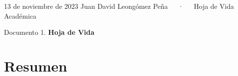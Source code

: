 \documentclass[11pt,a4paper,]{awesome-cv}
\begin{document}
\makecvheader

\makecvfooter
  {13 de noviembre de 2023}
    {Juan David Leongómez Peña~~~·~~~Hoja de Vida Académica}
  {\thepage}





\vspace{4mm}
\begin{tcolorbox}[enhanced,
        on line, 
        boxsep=4pt, left=0pt,right=0pt,top=0pt,bottom=0pt,
        colframe=white,colback=black]
  
\color{white}
\begin{LARGE}\begin{center}
Documento 1. \textbf{Hoja de Vida}
\end{center}\end{LARGE}
\end{tcolorbox}

\hypertarget{resumen}{%
\section{Resumen}\label{resumen}}
\end{document}
